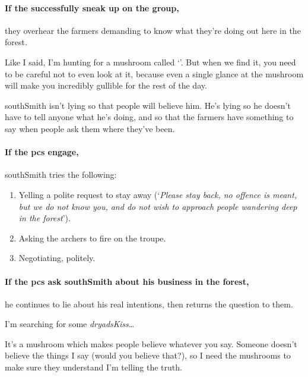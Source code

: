 \paragraph{If the successfully sneak up on the group,}
they overhear the farmers demanding to know what they're doing out here in the forest.

\begin{speechtext}
  Like I said, I'm hunting for a mushroom called `'.
  But when we find it, you need to be careful not to even look at it, because even a single glance at the mushroom will make you incredibly gullible for the rest of the day.
\end{speechtext}

\Gls{southSmith} isn't lying so that people will believe him.
He's lying so he doesn't have to tell anyone what he's doing, and so that the farmers have something to say when people ask them where they've been.


\paragraph{If the \glspl{pc} engage,}

\Gls{southSmith} tries the following:

\begin{enumerate}
  \item
  Yelling a polite request to stay away (`\textit{Please stay back, no offence is meant, but we do not know you, and do not wish to approach people wandering deep in the forest}').
  \item
  Asking the archers to fire on the troupe.
  \item
  Negotiating, politely.
\end{enumerate}

\paragraph{If the \glspl{pc} ask \gls{southSmith} about his business in the forest,}
he continues to lie about his real intentions, then returns the question to them.

\begin{speechtext}
  I'm searching for some \textit{\gls{dryadsKiss}}\ldots

  It's a mushroom which makes people believe whatever you say.
  Someone doesn't believe the things I say (would you believe that?), so I need the mushrooms to make sure they understand I'm telling the truth.
\end{speechtext}

